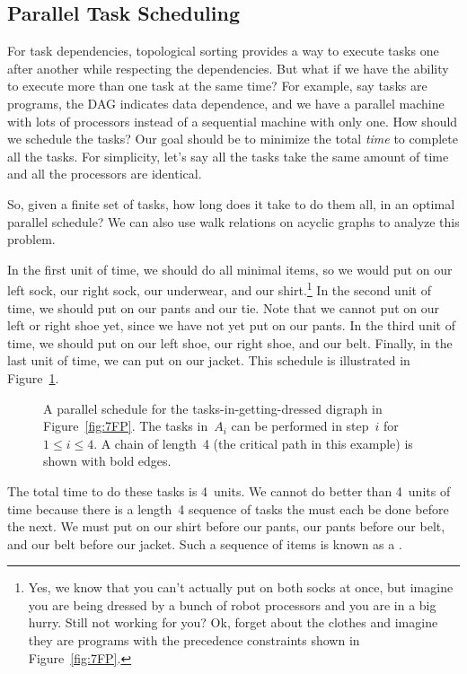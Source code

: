 \subsection{Parallel Task Scheduling}\label{parallel_sec}

For task dependencies, topological sorting provides a
way to execute tasks one after another while respecting the dependencies.
But what if we have the ability to execute more than one task at the same
time?  For example, say tasks are programs, the DAG indicates
data dependence, and we have a parallel machine with lots of processors
instead of a sequential machine with only one.  How should we schedule the
tasks?  Our goal should be to minimize the total \emph{time} to complete
all the tasks.  For simplicity, let's say all the tasks take the same
amount of time and all the processors are identical.

So, given a finite set of tasks, how long does it take to do them all,
in an optimal parallel schedule?  We can also use walk relations on
acyclic graphs to analyze this problem.

In the first unit of time, we should do all minimal items, so we would
put on our left sock, our right sock, our underwear, and our
shirt.\footnote{Yes, we know that you can't actually put on both socks
  at once, but imagine you are being dressed by a bunch of robot
  processors and you are in a big hurry.  Still not working for you?
  Ok, forget about the clothes and imagine they are programs with the
  precedence constraints shown in Figure~\ref{fig:7FP}.}  In the
second unit of time, we should put on our pants and our tie.  Note
that we cannot put on our left or right shoe yet, since we have not
yet put on our pants.  In the third unit of time, we should put on our
left shoe, our right shoe, and our belt.  Finally, in the last unit of
time, we can put on our jacket.  This schedule is illustrated in
Figure~\ref{fig:7FS}.

\begin{figure}


\caption{A parallel schedule for the tasks-in-getting-dressed digraph in
Figure~\ref{fig:7FP}.  The tasks in~$A_i$ can be performed in step~$i$
for $1 \le i \le 4$.  A chain of length~4 (the critical path in this
example) is shown with bold edges.}

\label{fig:7FS}

\end{figure}

The total time to do these tasks is 4~units.  We cannot do better than
4~units of time because there is a length~4 sequence of tasks the must
each be done before the next.  We must put on our shirt before our
pants, our pants before our belt, and our belt before our jacket.
Such a sequence of items is known as a .

